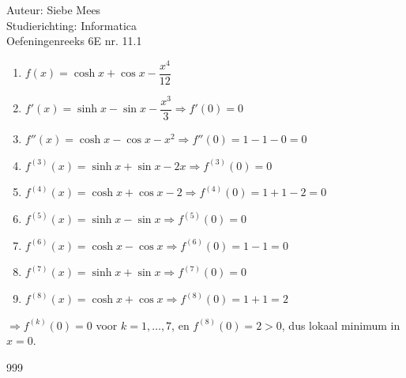 \documentclass[a4paper]{article}
\begin{document}
  
\noindent \large Auteur: Siebe Mees \\
\noindent \large Studierichting: Informatica \\
\noindent \large Oefeningenreeks 6E nr. 11.1 \\

\medskip

\normalsize

\begin{enumerate}
  \item $f(x) = \cosh x + \cos x - \dfrac{x^4}{12}$
  \item $f'(x) = \sinh x - \sin x - \dfrac{x^3}{3} \Rightarrow f'(0) = 0$
  \item $f''(x) = \cosh x - \cos x - x^2 \Rightarrow f''(0) = 1 - 1 - 0 = 0$
  \item $f^{(3)}(x) = \sinh x + \sin x - 2x \Rightarrow f^{(3)}(0) = 0$
  \item $f^{(4)}(x) = \cosh x + \cos x - 2 \Rightarrow f^{(4)}(0) = 1 + 1 - 2 = 0$
  \item $f^{(5)}(x) = \sinh x - \sin x \Rightarrow f^{(5)}(0) = 0$
  \item $f^{(6)}(x) = \cosh x - \cos x \Rightarrow f^{(6)}(0) = 1 - 1 = 0$
  \item $f^{(7)}(x) = \sinh x + \sin x \Rightarrow f^{(7)}(0) = 0$
  \item $f^{(8)}(x) = \cosh x + \cos x \Rightarrow f^{(8)}(0) = 1 + 1 = 2$
\end{enumerate}

$ \Rightarrow f^{(k)}(0) = 0 $ voor $ k = 1, \dots, 7$, en $f^{(8)}(0) = 2 > 0$, dus lokaal minimum in $x = 0$.

\begin{thebibliography}{999}
\end{thebibliography}
\end{document}
